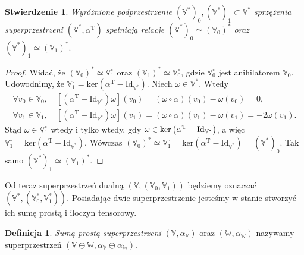 \documentclass[11pt,a4paper]{report}
\newtheorem{proposition}[theorem]{Stwierdzenie}
\theoremstyle{definition}
\newtheorem{definition}[theorem]{Definicja}
\begin{document}
\begin{proposition}
	Wyróżnione podprzestrzenie $(\mathbb{V}^*)_0,(\mathbb{V}^*)_1 \subset \mathbb{V}^*$ sprzężenia superprzestrzeni $(\mathbb{V}^*,\alpha^\mathrm{T})$ spełniają relacje $(\mathbb{V}^*)_0 \simeq (\mathbb{V}_0)^*$ oraz  $(\mathbb{V}^*)_1 \simeq (\mathbb{V}_1)^*.$
\end{proposition}

\begin{proof}
	Widać, że $(\mathbb{V}_0)^* \simeq \mathbb{V}_1^{\circ}$ oraz $(\mathbb{V}_1)^* \simeq \mathbb{V}_0^{\circ}$, gdzie $\mathbb{V}_0^{\circ}$ jest anihilatorem $\mathbb{V}_0$. Udowodnimy, że $\mathbb{V}_1^{\circ} = \textrm{ker} \left( \alpha^\mathrm{T} - \textrm{Id}_{\mathbb{V}^*}\right)\!.$ Niech $\omega \in \mathbb{V}^*$. Wtedy
	\begin{equation*} 
		\begin{gathered}
			\forall v_0 \in \mathbb{V}_0, \quad \left[ \left( \alpha^\mathrm{T} - \textrm{Id}_{\mathbb{V}^*}\right) \omega \right] (v_0) = \left( \omega \circ \alpha \right) (v_0) - \omega (v_0) = 0, \\
			\forall v_1 \in \mathbb{V}_1, \quad \left[ \left( \alpha^\mathrm{T} - \textrm{Id}_{\mathbb{V}^*}\right) \omega \right] (v_1) = \left( \omega \circ \alpha \right) (v_1) - \omega (v_1) = -2\omega (v_1).
		\end{gathered}
	\end{equation*}
	Stąd $\omega \in \mathbb{V}_1^{\circ}$ wtedy i tylko wtedy, gdy $\omega \in \rm{ker} \left( \alpha^\mathrm{T} - \textrm{Id}_{\mathbb{V}^*} \right)$, a więc $\mathbb{V}_1^{\circ} = \textrm{ker} \left( \alpha^\mathrm{T} - \textrm{Id}_{\mathbb{V}^*}\right)\!.$  Wówczas $(\mathbb{V}_0)^* \simeq \mathbb{V}_1^{\circ}=\textrm{ker} \left( \alpha^\mathrm{T} - \textrm{Id}_{\mathbb{V}^*}\right)=(\mathbb{V}^*)_0.$ Tak samo $(\mathbb{V}^*)_1 \simeq (\mathbb{V}_1)^*$.
\end{proof}  

Od teraz superprzestrzeń dualną $(\mathbb{V},(\mathbb{V}_0, \mathbb{V}_1))$ będziemy oznaczać $(\mathbb{V}^{*},(\mathbb{V}_0^{*}, \mathbb{V}_1^{*}))$. Posiadając dwie superprzestrzenie jesteśmy w stanie stworzyć ich sumę prostą i iloczyn tensorowy.

\begin{definition}
	\textit{Sumą prostą superprzestrzeni} $(\mathbb{V},\alpha_\mathbb{V})$ oraz $(\mathbb{W},\alpha_\mathbb{W})$ nazywamy superprzestrzeń $(\mathbb{V} \oplus \mathbb{W}, \alpha_\mathbb{V} \oplus \alpha_\mathbb{W}).$
\end{definition}
\end{document}
